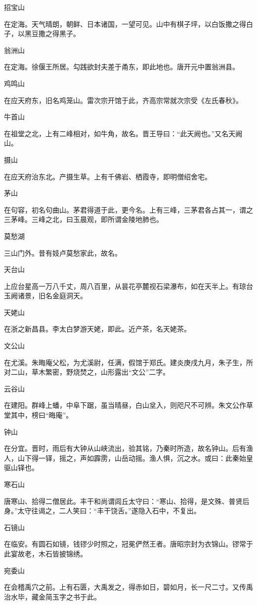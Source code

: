 \documentclass[a4paper,12pt,UTF8,twoside]{ctexbook}
\begin{document}
招宝山

在定海。天气晴朗，朝鲜、日本诸国，一望可见。山中有棋子坪，以白饭撒之得白子，以黑豆撒之得黑子。

翁洲山

在定海。徐偃王所居。勾践欲封夫差于甬东，即此地也。唐开元中置翁洲县。

鸡鸣山

在应天府东，旧名鸡笼山。雷次宗开馆于此，齐高宗常就次宗受《左氏春秋》。

牛首山

在祖堂之北，上有二峰相对，如牛角，故名。晋王导曰：“此天阙也。”又名天阙山。

摄山

在应天府治东北。产摄生草。上有千佛岩、栖霞寺，即明僧绍舍宅。

茅山

在句容，初名句曲山。茅君得道于此，更今名。上有三峰，三茅君各占其一，谓之三茅峰。三峰之北，曰玉晨观，即所谓金陵地肺也。

莫愁湖

三山门外。昔有妓卢莫愁家此，故名。

天台山

上应台星高一万八千丈，周八百里，从昙花亭麓视石梁瀑布，如在天半上。有琼台玉阙诸景，旧名金庭洞天。

天姥山

在浙之新昌县。李太白梦游天姥，即此。近产茶，名天姥茶。

文公山

在尤溪。朱晦庵父松，为尤溪尉，任满，假馆于郑氏。建炎庚戌九月，朱子生，所对二山，草木繁密，野烧焚之，山形露出“文公”二字。

云谷山

在建阳。群峰上蟠，中阜下踞，虽当晴昼，白山坌入，则咫尺不可辨。朱文公作草堂其中，榜曰“晦庵”。

钟山

在分宜。晋时，雨后有大钟从山峡流出，验其铭，乃秦时所造，故名钟山。后有渔人，山下得一铎，摇之，声如霹雳，山岳动摇。渔人惧，沉之水。或曰：此秦始皇驱山铎也。

寒石山

唐寒山、拾得二僧居此。丰干和尚谓闾丘太守曰：“寒山、拾得，是文殊、普贤后身。”太守往谒之，二人笑曰：“丰干饶舌。”遂隐入石中，不复出。

石镜山

在临安。有圆石如镜，钱镠少时照之，冠冕俨然王者。唐昭宗封为衣锦山。镠常于此宴故老，木石皆披锦绣。

宛委山

在会稽禹穴之前。上有石匮，大禹发之，得赤如日，碧如月，长一尺二寸。又传禹治水毕，藏金简玉字之书于此。
\end{document}
